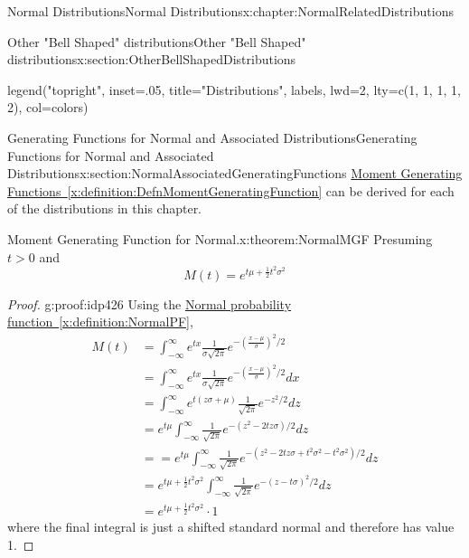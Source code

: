 \documentclass[oneside,10pt,]{book}
\newcommand{\xreffont}{\relax}
\numberwithin{equation}{section}
\newcommand{\gt}{>}
\begin{document}
\begin{chapterptx}{Normal Distributions}{}{Normal Distributions}{}{}{x:chapter:NormalRelatedDistributions}
\begin{sectionptx}{Other "Bell Shaped" distributions}{}{Other "Bell Shaped" distributions}{}{}{x:section:OtherBellShapedDistributions}
\begin{sageinput}
legend("topright", inset=.05, title="Distributions",
  labels, lwd=2, lty=c(1, 1, 1, 1, 2), col=colors)
\end{sageinput}
%
\end{sectionptx}
%
%
\typeout{************************************************}
\typeout{************************************************}
%
\begin{sectionptx}{Generating Functions for Normal and Associated Distributions}{}{Generating Functions for Normal and Associated Distributions}{}{}{x:section:NormalAssociatedGeneratingFunctions}
\hyperref[x:definition:DefnMomentGeneratingFunction]{Moment Generating Functions~{\xreffont\ref{x:definition:DefnMomentGeneratingFunction}}} can be derived for each of the distributions in this chapter.%
\par
\begin{theorem}{Moment Generating Function for Normal.}{}{x:theorem:NormalMGF}%
Presuming \(t \gt 0\) and%
\begin{equation*}
M(t) = e^{t \mu+\frac{1}{2}t^2\sigma^2}
\end{equation*}
%
\end{theorem}
\begin{proof}{}{g:proof:idp426}
Using the \hyperref[x:definition:NormalPF]{Normal probability function~{\xreffont\ref{x:definition:NormalPF}}},%
\begin{align*}
M(t) & = \int_{-\infty}^{\infty} e^{tx} \frac{1}{\sigma \sqrt{2 \pi}} e^{ -\left ( \frac{x-\mu}{\sigma} \right ) ^2 / 2}\\
& = \int_{-\infty}^{\infty} e^{tx} \frac{1}{\sigma \sqrt{2 \pi}} e^{ -\left ( \frac{x-\mu}{\sigma} \right ) ^2 / 2} dx\\
& = \int_{-\infty}^{\infty} e^{t(z \sigma + \mu)} \frac{1}{\sqrt{2 \pi}} e^{  -z ^2 / 2} dz\\
& = e^{t \mu} \int_{-\infty}^{\infty}  \frac{1}{\sqrt{2 \pi}} e^{  -(z ^2 - 2t z \sigma ) / 2} dz\\
& = = e^{t \mu} \int_{-\infty}^{\infty}  \frac{1}{\sqrt{2 \pi}} e^{  -(z ^2 - 2t z \sigma + t^2 \sigma^2 - t^2 \sigma^2 ) / 2} dz\\
& = e^{t \mu+\frac{1}{2}t^2\sigma^2} \int_{-\infty}^{\infty}  \frac{1}{\sqrt{2 \pi}} e^{  -\left (z - t \sigma \right )^2 / 2} dz\\
& = e^{t \mu+\frac{1}{2}t^2\sigma^2} \cdot 1 
\end{align*}
where the final integral is just a shifted standard normal and therefore has value 1.%

\end{proof}
\end{sectionptx}
\end{chapterptx}
\end{document}
